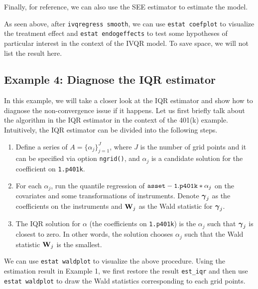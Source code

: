 Finally, for reference,  we can also use the SEE estimator to estimate the
model.

\begin{stlog}

\end{stlog}

As seen above, after {\tt ivqregress smooth}, we can use {\tt estat coefplot} to
visualize the treatment effect and {\tt estat endogeffects} to test some
hypotheses of particular interest in the context of the IVQR model. To save
space, we will not list the result here.

\subsection{Example 4: Diagnose the IQR estimator}
In this example, we will take a closer look at the IQR estimator and show how to
diagnose the non-convergence issue if it happens. Let us first briefly talk
about the algorithm in the IQR estimator in the context of the 401(k) example.
Intuitively, the IQR estimator can be divided into the following steps.

\begin{enumerate}
\item Define a series of $A = \{\alpha_j\}_{j=1}^J$, where $J$ is the number of
grid points and it can be specified via option {\tt ngrid()}, and $\alpha_j$ is
a candidate solution for the coefficient on {\tt 1.p401k}.

\item For each $\alpha_j$, run the quantile regression of ${\tt asset} - {\tt
1.p401k}*\alpha_j$ on the covariates and some transformations of instruments.
Denote $\boldsymbol{\gamma}_j$ as the coefficients on the instruments and $\mathbf{W}_j$ as the
Wald statistic for $\boldsymbol{\gamma}_j$.

\item The IQR solution for $\alpha$ (the coefficients on {\tt 1.p401k}) is the
$\alpha_j$ such that $\boldsymbol{\gamma}_j$ is closest to zero. In other words, the
solution chooses $\alpha_j$ such that the Wald statistic $\mathbf{W}_j$ is the
smallest.

\end{enumerate}

We can use {\tt estat waldplot} to visualize the above procedure. Using the
estimation result in Example 1, we first restore the result {\tt est\_iqr} and
then use {\tt estat waldplot} to draw the Wald statistics corresponding to each
grid points.

